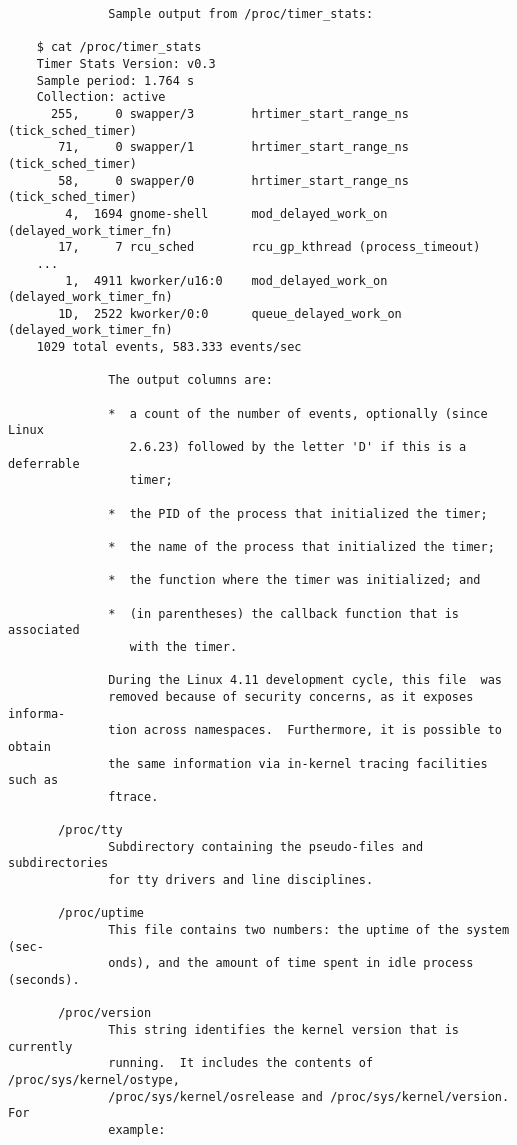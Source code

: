 \documentclass[]{article}
\begin{document}
\begin{verbatim}
              Sample output from /proc/timer_stats:

    $ cat /proc/timer_stats
    Timer Stats Version: v0.3
    Sample period: 1.764 s
    Collection: active
      255,     0 swapper/3        hrtimer_start_range_ns (tick_sched_timer)
       71,     0 swapper/1        hrtimer_start_range_ns (tick_sched_timer)
       58,     0 swapper/0        hrtimer_start_range_ns (tick_sched_timer)
        4,  1694 gnome-shell      mod_delayed_work_on (delayed_work_timer_fn)
       17,     7 rcu_sched        rcu_gp_kthread (process_timeout)
    ...
        1,  4911 kworker/u16:0    mod_delayed_work_on (delayed_work_timer_fn)
       1D,  2522 kworker/0:0      queue_delayed_work_on (delayed_work_timer_fn)
    1029 total events, 583.333 events/sec

              The output columns are:

              *  a count of the number of events, optionally (since Linux
                 2.6.23) followed by the letter 'D' if this is a deferrable
                 timer;

              *  the PID of the process that initialized the timer;

              *  the name of the process that initialized the timer;

              *  the function where the timer was initialized; and

              *  (in parentheses) the callback function that is associated
                 with the timer.

              During the Linux 4.11 development cycle, this file  was
              removed because of security concerns, as it exposes informa‐
              tion across namespaces.  Furthermore, it is possible to obtain
              the same information via in-kernel tracing facilities such as
              ftrace.

       /proc/tty
              Subdirectory containing the pseudo-files and subdirectories
              for tty drivers and line disciplines.

       /proc/uptime
              This file contains two numbers: the uptime of the system (sec‐
              onds), and the amount of time spent in idle process (seconds).

       /proc/version
              This string identifies the kernel version that is currently
              running.  It includes the contents of /proc/sys/kernel/ostype,
              /proc/sys/kernel/osrelease and /proc/sys/kernel/version.  For
              example:


\end{verbatim}
\end{document}
